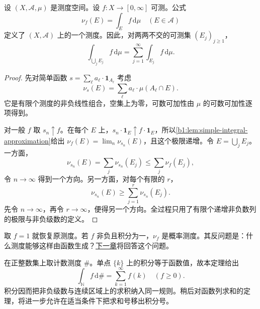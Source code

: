 \begin{theorem}\label{b1:thm:integral-induced-measure}
设 \((X,\mathcal A,\mu)\) 是测度空间。设 \(f:X\rightarrow[0,\infty]\) 可测。公式
\[
\nu_f(E)=\int_E f\,\mathrm d\mu\quad(E\in\mathcal A)
\]
定义了 \((X,\mathcal A)\) 上的一个测度。因此，对两两不交的可测集 \((E_j)_{j\geq1}\)，
\[
\int_{\bigcup_jE_j}f\,\mathrm d\mu
=\sum_{j=1}^{\infty}\int_{E_j}f\,\mathrm d\mu.
\]
\end{theorem}
\begin{proof}
先对简单函数 \(s=\sum_\ell a_\ell\cdot\mathbf1_{A_\ell}\) 考虑
\[
\nu_s(E)=\sum_\ell a_\ell\cdot\mu(A_\ell\cap E).
\]
它是有限个测度的非负线性组合，空集上为零，可数可加性由 \(\mu\) 的可数可加性逐项得到。

对一般 \(f\) 取 \(s_n\uparrow f\)。在每个 \(E\) 上，\(s_n\cdot\mathbf1_E\uparrow f\cdot\mathbf1_E\)，所以\cref{b1:lem:simple-integral-approximation}给出
\(\nu_f(E)=\lim_n\nu_{s_n}(E)\)，且这个极限递增。令 \(E=\bigcup_jE_j\)。一方面，
\[
\nu_{s_n}(E)=\sum_j\nu_{s_n}(E_j)\leq\sum_j\nu_f(E_j),
\]
令 \(n\to\infty\) 得到一个方向。另一方面，对每个有限的 \(r\)，
\[
\nu_{s_n}(E)\geq\sum_{j=1}^{r}\nu_{s_n}(E_j).
\]
先令 \(n\to\infty\)，再令 \(r\to\infty\)，便得另一个方向。全过程只用了有限个递增非负数列的极限与非负级数的定义。
\end{proof}

取 \(f=1\) 就恢复原测度。若 \(f\) 非负且积分为一，\(\nu_f\) 是概率测度。其反问题是：什么测度能够这样由函数生成？\hyperref[b1:ch:06]{下一章}将回答这个问题。

\ProseParagraphBreak

在正整数集上取计数测度 \(\#\)。单点 \(\{k\}\) 上的积分等于函数值，故本定理给出
\[
\int_{\mathbb N}f\,\mathrm d\#=\sum_{k=1}^{\infty}f(k)\quad(f\geq0).
\]
积分因而把非负级数与连续区域上的求积纳入同一规则。稍后对函数列求和的定理，将进一步允许在适当条件下把求和号移出积分号。
